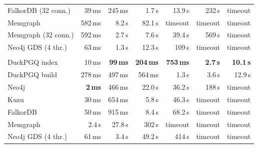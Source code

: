 \begin{table}[t]
\begin{tabular}{lrrrrrr}
\quad FalkorDB (32 conn.) & 39\,ms & 245\,ms & 1.7\,s & 13.9\,s & 232\,s & timeout \\
\quad Memgraph & 582\,ms & 8.2\,s & 82.1\,s & timeout & timeout & timeout \\
\quad Memgraph (32 conn.) & 592\,ms & 2.7\,s & 7.6\,s & 39.4\,s & 569\,s & timeout \\
\quad Neo4j GDS (4 thr.) & 63\,ms & 1.3\,s & 12.3\,s & 109\,s & timeout & timeout \\
\addlinespace
\multicolumn{7}{l}{\textit{LDBC SF300}} \\
\quad DuckPGQ index & 10\,ms & \textbf{99\,ms} & \textbf{204\,ms} & \textbf{753\,ms} & \textbf{2.7\,s} & \textbf{10.1\,s} \\
\quad DuckPGQ build & 278\,ms & 497\,ms & 564\,ms & 1.3\,s & 3.6\,s & 12.9\,s \\
\quad Neo4j & \textbf{2\,ms} & 466\,ms & 22.0\,s & 36.2\,s & 188\,s & timeout \\
\quad Kuzu & 30\,ms & 654\,ms & 5.8\,s & 46.3\,s & timeout & timeout \\
\quad FalkorDB & 50\,ms & 915\,ms & 8.4\,s & 68.2\,s & timeout & timeout \\
\quad Memgraph & 2.4\,s & 27.8\,s & 302\,s & timeout & timeout & timeout \\
\quad Neo4j GDS (4 thr.) & 61\,ms & 3.4\,s & 49.2\,s & 414\,s & timeout & timeout \\
\bottomrule\end{tabular}\end{table}
